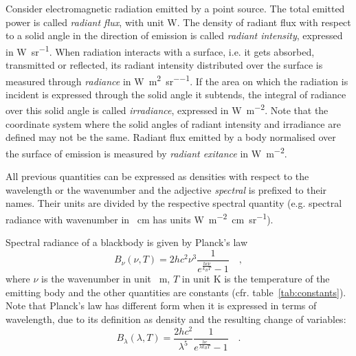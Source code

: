 \documentclass[a4paper,10pt,twocolumn,\classoptions]{article}
\begin{document}
Consider electromagnetic radiation emitted by a point source. The total emitted power is called \emph{radiant flux}, with unit \unit{\watt}. The density of radiant flux with respect to a solid angle in the direction of emission is called \emph{radiant intensity}, expressed in \unit{\watt\per\steradian}. When radiation interacts with a surface, i.e. it gets absorbed, transmitted or reflected, its radiant intensity distributed over the surface is measured through \emph{radiance} in \unit{\watt\per\square\metre\per\steradian}. If the area on which the radiation is incident is expressed through the solid angle it subtends, the integral of radiance over this solid angle is called \emph{irradiance}, expressed in \unit{\watt\per\square\metre}. Note that the coordinate system where the solid angles of radiant intensity and irradiance are defined may not be the same. Radiant flux emitted by a body normalised over the surface of emission is measured by \emph{radiant exitance} in \unit{\watt\per\square\metre}.

All previous quantities can be expressed as densities with respect to the wavelength or the wavenumber and the adjective \emph{spectral} is prefixed to their names. Their units are divided by the respective spectral quantity (e.g. spectral radiance with wavenumber in \unit{\per\centi\metre} has units \unit{\watt\per\metre\squared\centi\metre\per\steradian}).

Spectral radiance of a blackbody is given by Planck's law
\begin{equation}
  \label{eq:spectral_radiance_blackbody}
  B_\nu (\nu, T) = 2 h c^2 \nu^3 \frac{1}{e^\frac{h c \nu}{k_B T} - 1}
  \quad ,
\end{equation}
where $\nu$ is the wavenumber in unit \unit{\per\metre}, $T$ in unit \unit{\kelvin} is the temperature of the emitting body and the other quantities are constants (cfr. table~\ref{tab:constants}).
Note that Planck's law has different form when it is expressed in terms of wavelength, due to its definition as density and the resulting change of variables:
\begin{equation}
  \label{eq:spectral_radiance_blackbody_lambda}
  B_\lambda (\lambda, T) = \frac{2 h c^2}{\lambda^5} \frac{1}{e^\frac{h c}{\lambda k_B T} - 1}
  \quad .
\end{equation}
\end{document}
